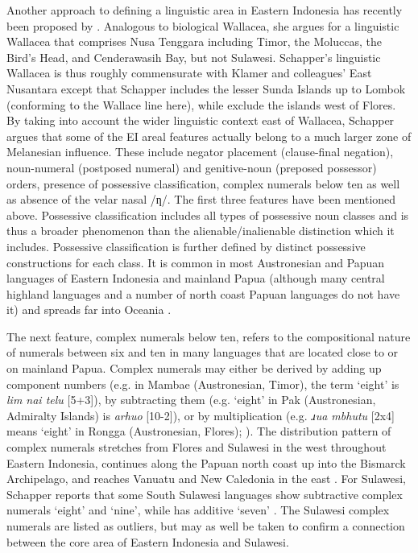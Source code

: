 Another approach to defining a linguistic area in Eastern Indonesia has recently been proposed by \citet{schapper2015wallacea}. Analogous to biological Wallacea, she argues for a linguistic Wallacea that comprises Nusa Tenggara including Timor, the Moluccas, the Bird’s Head, and Cenderawasih Bay, but not Sulawesi. Schapper's linguistic Wallacea is thus roughly commensurate with Klamer and colleagues' East Nusantara except that Schapper includes the lesser Sunda Islands up to Lombok (conforming to the Wallace line here), while \citet{klamer2008east} exclude the islands west of Flores. By taking into account the wider linguistic context east of Wallacea, Schapper argues that some of the EI areal features actually belong to a much larger zone of Melanesian influence. These include negator placement (clause-final negation), noun-numeral (postposed numeral) and genitive-noun (preposed possessor) orders, presence of possessive classification, complex numerals below ten as well as absence of the velar nasal /ƞ/. The first three features have been mentioned above. Possessive classification includes all types of possessive noun classes and is thus a broader phenomenon than the alienable/inalienable distinction which it includes. Possessive classification is further defined by distinct possessive constructions for each class. It is common in most Austronesian and Papuan languages of Eastern Indonesia and mainland Papua (although many central highland languages and a number of north coast Papuan languages do not have it) and spreads far into Oceania \citep[109]{schapper2015wallacea}.

The next feature, complex numerals below ten, refers to the compositional nature of numerals between six and ten in many languages that are located close to or on mainland Papua. Complex numerals may either be derived by adding up component numbers (e.g. in Mambae (Austronesian, Timor), the term `eight' is \textit{lim nai telu} [5+3]), by subtracting them (e.g. `eight' in Pak (Austronesian, Admiralty Islands) is \textit{arhuo} [10-2]), or by multiplication (e.g. \textit{ɹua mbhutu} [2x4] means `eight' in Rongga (Austronesian, Flores); \citealt[113]{schapper2015wallacea}). The distribution pattern of complex numerals stretches from Flores and Sulawesi in the west throughout Eastern Indonesia, continues along the Papuan north coast up into the Bismarck Archipelago, and reaches Vanuatu and New Caledonia in the east \citep[112--4]{schapper2015wallacea}. For Sulawesi, Schapper reports that some South Sulawesi languages show subtractive complex numerals `eight' and `nine', while  has additive `seven' \citep[113f.]{schapper2015wallacea}. The Sulawesi complex numerals are listed as outliers, but may as well be taken to confirm a connection between the core area of Eastern Indonesia and Sulawesi.

